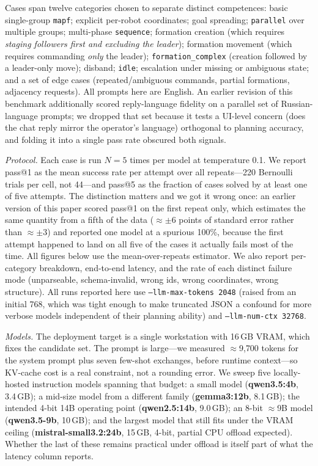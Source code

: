 \documentclass[10pt,twocolumn]{article}
\newcommand{\code}[1]{\texttt{\small #1}}
\begin{document}
Cases span twelve categories chosen to separate distinct competences:
basic single-group \code{mapf}; explicit per-robot coordinates; goal spreading;
\code{parallel} over multiple groups; multi-phase \code{sequence}; formation
creation (which requires \emph{staging followers first and excluding the
leader}); formation movement (which requires commanding \emph{only} the
leader); \code{formation\_complex} (creation followed by a leader-only move);
disband; \code{idle}; escalation under missing or ambiguous state; and a set of
edge cases (repeated/ambiguous commands, partial formations, adjacency
requests). All prompts here are English. An earlier revision of this
benchmark additionally scored reply-language fidelity on a parallel set of
Russian-language prompts; we dropped that set because it tests a UI-level
concern (does the chat reply mirror the operator's language) orthogonal to
planning accuracy, and folding it into a single pass rate obscured both
signals.

\emph{Protocol.} Each case is run $N{=}5$ times per model at temperature 0.1.
We report pass@1 as the mean success rate per attempt over all repeats---220
Bernoulli trials per cell, not 44---and pass@5 as the fraction of cases
solved by at least one of five attempts. The distinction matters and we got
it wrong once: an earlier version of this paper scored pass@1 on the first
repeat only, which estimates the same quantity from a fifth of the data
($\approx\pm6$ points of standard error rather than $\approx\pm3$) and
reported one model at a spurious 100\%, because the first attempt happened to
land on all five of the cases it actually fails most of the time. All figures
below use the mean-over-repeats estimator. We also report per-category breakdown,
end-to-end latency, and the rate of each distinct failure mode (unparseable,
schema-invalid, wrong ids, wrong coordinates, wrong structure). All runs
reported here use \code{--llm-max-tokens 2048} (raised from an initial
768, which was tight enough to make truncated JSON a confound for more
verbose models independent of their planning ability) and
\code{--llm-num-ctx 32768}.

\emph{Models.} The deployment target is a single workstation with 16\,GB VRAM,
which fixes the candidate set. The prompt is large---we measured
$\approx$9{,}700 tokens for the system prompt plus seven few-shot exchanges,
before runtime context---so KV-cache cost is a real constraint, not a rounding
error. We sweep five locally-hosted instruction models spanning that budget:
a small model (\textbf{qwen3.5:4b}, 3.4\,GB); a mid-size model from a
different family (\textbf{gemma3:12b}, 8.1\,GB); the intended 4-bit 14B
operating point (\textbf{qwen2.5:14b}, 9.0\,GB); an 8-bit $\approx$9B model
(\textbf{qwen3.5-9b}, 10\,GB); and the largest model that still fits under the
VRAM ceiling (\textbf{mistral-small3.2:24b}, 15\,GB, 4-bit, partial CPU
offload expected). Whether the last of these remains practical under offload
is itself part of what the latency column reports.
\end{document}
